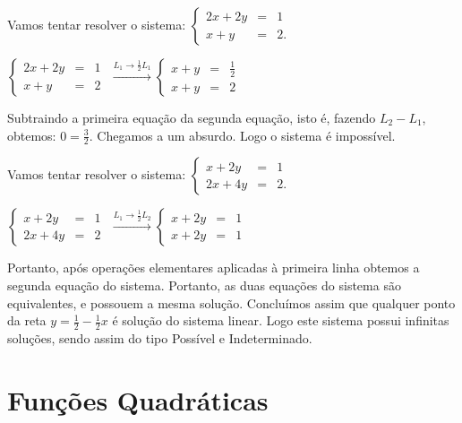 
\begin{ex} Vamos tentar resolver o sistema: $\left\{ \begin{array}{rcl}
2x+2y&=&1\\
x+y&=&2.
\end{array}\right.$

\noindent$\left\{ \begin{array}{rcl}
2x+2y&=&1\\
x+y&=&2
\end{array}\right.$ $\xrightarrow[]{L_1\rightarrow \frac{1}{2}L_1}\left\{ \begin{array}{rcl}
x+y&=&\frac{1}{2}\\
x+y&=&2
\end{array}\right.$


Subtraindo a primeira equação da segunda equação, isto é, fazendo $L_2-L_1$, obtemos: $0=\frac{3}{2}$.
Chegamos a um absurdo. Logo o sistema é impossível.
\end{ex}


\begin{ex} Vamos tentar resolver o sistema: $\left\{ \begin{array}{rcl}
x+2y&=&1\\
2x+4y&=&2.
\end{array}\right.$

\noindent$\left\{ \begin{array}{rcl}
x+2y&=&1\\
2x+4y&=&2
\end{array}\right.$ $\xrightarrow[]{L_1\rightarrow \frac{1}{2}L_2}\left\{ \begin{array}{rcl}
x+2y&=&1\\
x+2y&=&1
\end{array}\right.$


Portanto, após operações elementares aplicadas à primeira linha obtemos a segunda equação do sistema. Portanto, as duas
equações do sistema são equivalentes, e possouem a mesma solução. Concluímos assim que qualquer ponto da reta $y=\frac{1}{2}-\frac{1}{2}x$
é solução do sistema linear. Logo este sistema possui infinitas soluções, sendo assim do tipo Possível e Indeterminado.
\end{ex}

\section{Funções Quadráticas}

